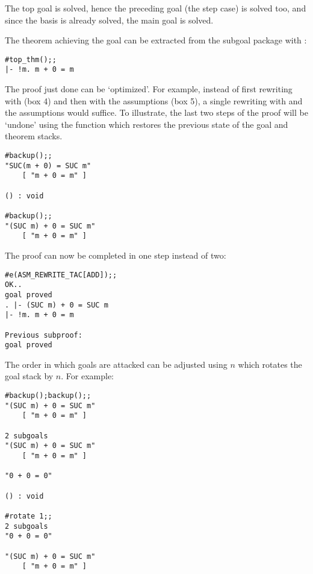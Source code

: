 \noindent The top goal is solved, hence the preceding goal (the step case)
is solved too, and since the basis is already solved, the main goal is solved.

The theorem achieving the goal can be extracted from the subgoal package with
:

\begin{session}\begin{verbatim}
#top_thm();;
|- !m. m + 0 = m
\end{verbatim}\end{session}

The proof just done can be `optimized'. For example, instead
of first rewriting with  (box 4) and then with the assumptions
(box 5), a single rewriting with  and the assumptions would suffice.
To illustrate, the last two steps of the proof will be `undone' using the function
 which restores the previous state of the goal and theorem stacks.

\begin{session}\begin{verbatim}
#backup();;
"SUC(m + 0) = SUC m"
    [ "m + 0 = m" ]

() : void

#backup();;
"(SUC m) + 0 = SUC m"
    [ "m + 0 = m" ]
\end{verbatim}\end{session}

\noindent The proof can now be completed in one step instead of two:

\begin{session}\begin{verbatim}
#e(ASM_REWRITE_TAC[ADD]);;
OK..
goal proved
. |- (SUC m) + 0 = SUC m
|- !m. m + 0 = m

Previous subproof:
goal proved
\end{verbatim}\end{session}


The order in which goals are attacked can be adjusted using $n$
which rotates the goal stack by $n$. For example:

\begin{session}\begin{verbatim}
#backup();backup();;
"(SUC m) + 0 = SUC m"
    [ "m + 0 = m" ]

2 subgoals
"(SUC m) + 0 = SUC m"
    [ "m + 0 = m" ]

"0 + 0 = 0"

() : void

#rotate 1;;
2 subgoals
"0 + 0 = 0"

"(SUC m) + 0 = SUC m"
    [ "m + 0 = m" ]
\end{verbatim}\end{session}

